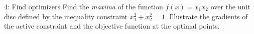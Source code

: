 
\begin{problem}{4: Find optimizers}
  Find the \textit{maxima} of the function $f(x) = x_1x_2$ over the unit disc defined by the inequality constraint $x_1^2 + x_2^2 = 1$. Illustrate the gradients of the 
  active constraint and the objective function at the optimal points.
\end{problem}

